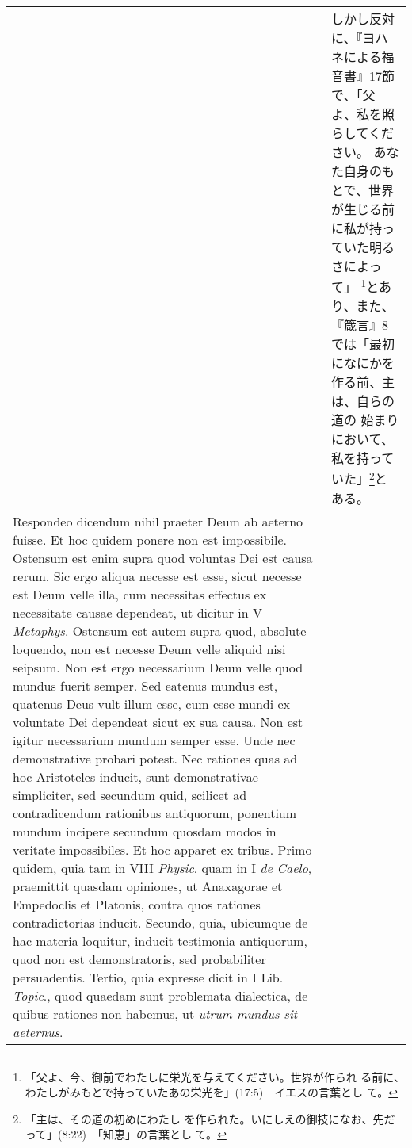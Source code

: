 \documentclass[10pt]{jsarticle} %
\begin{document}
\begin{longtable}{p{21em}p{21em}}
&

しかし反対に、『ヨハネによる福音書』17節で、「父よ、私を照らしてください。
 あなた自身のもとで、世界が生じる前に私が持っていた明るさによって」
 \footnote {「父よ、今、御前でわたしに栄光を与えてください。世界が作られ
 る前に、わたしがみもとで持っていたあの栄光を」(17:5)　イエスの言葉とし
 て。}とあり、また、『箴言』8では「最初になにかを作る前、主は、自らの道の
 始まりにおいて、私を持っていた」\footnote {「主は、その道の初めにわたし
 を作られた。いにしえの御技になお、先だって」(8:22)　「知恵」の言葉とし
 て。}とある。


\\



{\sc Respondeo dicendum} nihil praeter Deum ab aeterno fuisse. Et hoc
 quidem ponere non est impossibile. Ostensum est enim supra quod
 voluntas Dei est causa rerum. Sic ergo aliqua necesse est esse, sicut
 necesse est Deum velle illa, cum necessitas effectus ex necessitate
 causae dependeat, ut dicitur in V {\it Metaphys}. Ostensum est autem
 supra quod, absolute loquendo, non est necesse Deum velle aliquid nisi
 seipsum. Non est ergo necessarium Deum velle quod mundus fuerit
 semper. Sed eatenus mundus est, quatenus Deus vult illum esse, cum esse
 mundi ex voluntate Dei dependeat sicut ex sua causa. Non est igitur
 necessarium mundum semper esse. Unde nec demonstrative probari
 potest. Nec rationes quas ad hoc Aristoteles inducit, sunt
 demonstrativae simpliciter, sed secundum quid, scilicet ad
 contradicendum rationibus antiquorum, ponentium mundum incipere
 secundum quosdam modos in veritate impossibiles. Et hoc apparet ex
 tribus. Primo quidem, quia tam in VIII {\it Physic}. quam in I {\it de
 Caelo}, praemittit quasdam opiniones, ut Anaxagorae et Empedoclis et
 Platonis, contra quos rationes contradictorias inducit. Secundo, quia,
 ubicumque de hac materia loquitur, inducit testimonia antiquorum, quod
 non est demonstratoris, sed probabiliter persuadentis. Tertio, quia
 expresse dicit in I Lib. {\it Topic}., quod quaedam sunt problemata
 dialectica, de quibus rationes non habemus, ut {\it utrum mundus sit
 aeternus}.

&


\end{longtable}
\end{document}
